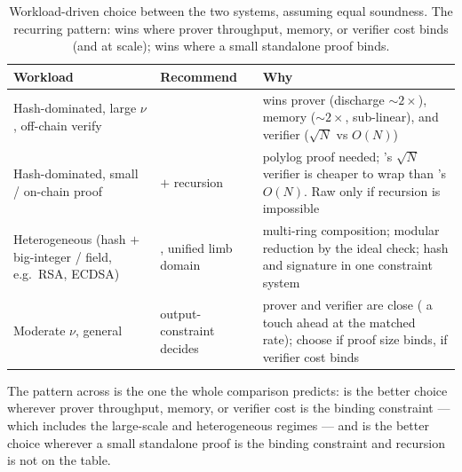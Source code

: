 \begin{table}[h]
\centering
\renewcommand{\arraystretch}{1.3}
\begin{tabularx}{\textwidth}{@{}llX@{}}
\toprule
\textbf{Workload} & \textbf{Recommend} & \textbf{Why} \\
\midrule
Hash-dominated, large $\nu$, off-chain verify &
  \zinc{} &
  wins prover (discharge $\sim$$2\times$), memory ($\sim$$2\times$,
  sub-linear), and verifier ($\sqrt N$ vs $O(N)$) \\
Hash-dominated, small / on-chain proof &
  \zinc{} $+$ recursion &
  polylog proof needed; \zinc{}'s $\sqrt N$ verifier is cheaper to wrap
  than \binius{}'s $O(N)$. Raw \binius{} only if recursion is impossible \\
Heterogeneous (hash $+$ big-integer / field, e.g.\ RSA, ECDSA) &
  \zinc{}, unified limb domain &
  multi-ring composition; modular reduction by the ideal check; hash and
  signature in one constraint system \\
Moderate $\nu$, general &
  output-constraint decides &
  prover and verifier are close (\zinc{} a touch ahead at the matched
  rate); choose \binius{} if proof size binds, \zinc{} if verifier cost
  binds \\
\bottomrule
\end{tabularx}
\caption{Workload-driven choice between the two systems, assuming equal
soundness. The recurring pattern: \zinc{} wins where prover throughput,
memory, or verifier cost binds (and at scale); \binius{} wins where a
small standalone proof binds.}
\label{tab:guidance}
\end{table}

The pattern across  is the one the whole comparison
predicts: \zinc{} is the better choice wherever prover throughput,
memory, or verifier cost is the binding constraint --- which includes the
large-scale and heterogeneous regimes --- and \binius{} is the better
choice wherever a small standalone proof is the binding constraint and
recursion is not on the table.
